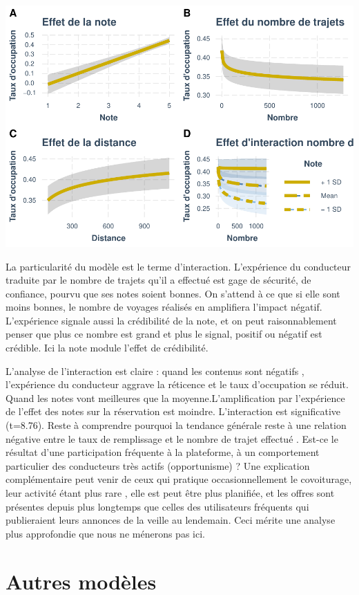 \documentclass[
]{book}
\begin{document}
\includegraphics{bookdown-demo_files/figure-latex/0911-2.pdf}

La particularité du modèle est le terme d'interaction. L'expérience du conducteur traduite par le nombre de trajets qu'il a effectué est gage de sécurité, de confiance, pourvu que ses notes soient bonnes. On s'attend à ce que si elle sont moins bonnes, le nombre de voyages réalisés en amplifiera l'impact négatif. L'expérience signale aussi la crédibilité de la note, et on peut raisonnablement penser que plus ce nombre est grand et plus le signal, positif ou négatif est crédible. Ici la note module l'effet de crédibilité.

L'analyse de l'interaction est claire : quand les contenus sont négatifs , l'expérience du conducteur aggrave la réticence et le taux d'occupation se réduit. Quand les notes vont meilleures que la moyenne.L'amplification par l'expérience de l'effet des notes sur la réservation est moindre. L'interaction est significative (t=8.76). Reste à comprendre pourquoi la tendance générale reste à une relation négative entre le taux de remplissage et le nombre de trajet effectué . Est-ce le résultat d'une participation fréquente à la plateforme, à un comportement particulier des conducteurs très actifs (opportunisme) ? Une explication complémentaire peut venir de ceux qui pratique occasionnellement le covoiturage, leur activité étant plus rare , elle est peut être plus planifiée, et les offres sont présentes depuis plus longtemps que celles des utilisateurs fréquents qui publieraient leurs annonces de la veille au lendemain. Ceci mérite une analyse plus approfondie que nous ne ménerons pas ici.

\hypertarget{autres-moduxe8les}{%
\section{Autres modèles}\label{autres-moduxe8les}}
\end{document}
